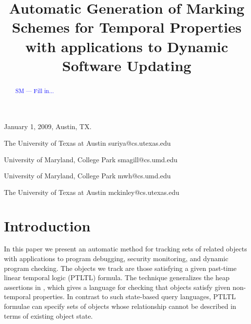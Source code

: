 \documentclass[natbib,preprint]{sigplanconf}
\newcommand{\stephencomment}[1]{\textcolor{blue}{SM --- #1}}
\begin{document}
 {January 1, 2009, Austin, TX.}


\title{Automatic Generation of Marking Schemes for Temporal Properties with applications to
Dynamic Software Updating
    }




           {The University of Texas at Austin}
           {suriya@cs.utexas.edu}

           {University of Maryland, College Park}
           {smagill@cs.umd.edu}

           {University of Maryland, College Park}
           {mwh@cs.umd.edu}

           {The University of Texas at Austin}
           {mckinley@cs.utexas.edu}

\maketitle

\begin{abstract}
\stephencomment{Fill in...}



\end{abstract}

\section{Introduction}

In this paper we present an automatic method for tracking sets of
related objects with applications to program debugging, security monitoring,
and dynamic program checking.
The objects we track are those satisfying a given past-time
linear temporal logic (PTLTL) formula.  The technique generalizes the heap assertions in
\cite{gc-heap-assertions},
which gives a language for checking that objects satisfy given non-temporal
properties.  In contrast to such state-based query languages,
PTLTL formulae can specify sets of objects whose relationship cannot be described
in terms of existing object state.
\end{document}
